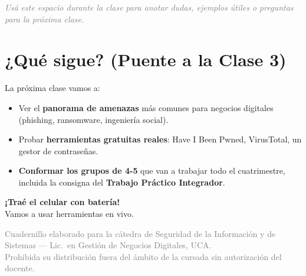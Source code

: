 \documentclass[12pt,a4paper]{article}
\begin{document}
\begin{tcolorbox}[colback=grisClaro, colframe=gray!50, arc=2mm, height=8cm]
\textcolor{gray}{\itshape Us\'a este espacio durante la clase para anotar dudas,
ejemplos \'utiles o preguntas para la pr\'oxima clase.}
\end{tcolorbox}

\section{¿Qu\'e sigue? (Puente a la Clase 3)}

La pr\'oxima clase vamos a:
\begin{itemize}[leftmargin=2em]
  \item Ver el \textbf{panorama de amenazas} m\'as comunes para negocios digitales
        (phishing, ransomware, ingenier\'ia social).
  \item Probar \textbf{herramientas gratuitas reales}: Have I Been Pwned,
        VirusTotal, un gestor de contrase\~nas.
  \item \textbf{Conformar los grupos de 4-5} que van a trabajar todo el
        cuatrimestre, incluida la consigna del \textbf{Trabajo Pr\'actico Integrador}.
\end{itemize}

\begin{center}
\begin{tcolorbox}[colback=rojoAlerta!8, colframe=rojoAlerta,
                  width=0.8\textwidth, halign=center, arc=3mm]
  \Large{}\; \textbf{¡Tra\'e el celular con bater\'ia!}\\[4pt]
  \normalsize Vamos a usar herramientas en vivo.
\end{tcolorbox}
\end{center}

\vfill
\begin{center}
\small\textcolor{gray}{%
Cuadernillo elaborado para la c\'atedra de Seguridad de la Informaci\'on y de
Sistemas --- Lic.\ en Gesti\'on de Negocios Digitales, UCA.\\
Prohibida su distribuci\'on fuera del \'ambito de la cursada sin autorizaci\'on del docente.}
\end{center}
\end{document}
